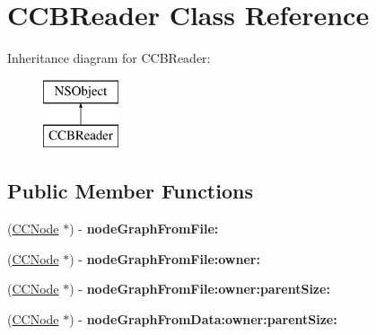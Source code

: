 \hypertarget{interface_c_c_b_reader}{\section{C\-C\-B\-Reader Class Reference}
\label{interface_c_c_b_reader}
}
Inheritance diagram for C\-C\-B\-Reader\-:\begin{figure}[H]
\begin{center}
\leavevmode
\includegraphics[height=2.000000cm]{interface_c_c_b_reader}
\end{center}
\end{figure}
\subsection*{Public Member Functions}
\begin{DoxyCompactItemize}
\item 
\hypertarget{interface_c_c_b_reader_a21a9fe5c290e7bf42a1271ffa086e96e}{(\hyperlink{class_c_c_node}{C\-C\-Node} $\ast$) -\/ {\bfseries node\-Graph\-From\-File\-:}}\label{interface_c_c_b_reader_a21a9fe5c290e7bf42a1271ffa086e96e}

\item 
\hypertarget{interface_c_c_b_reader_a1c30b37eb372c34d73dffa145f46c572}{(\hyperlink{class_c_c_node}{C\-C\-Node} $\ast$) -\/ {\bfseries node\-Graph\-From\-File\-:owner\-:}}\label{interface_c_c_b_reader_a1c30b37eb372c34d73dffa145f46c572}

\item 
\hypertarget{interface_c_c_b_reader_a81743976fb69a6f6366852ddc520f1da}{(\hyperlink{class_c_c_node}{C\-C\-Node} $\ast$) -\/ {\bfseries node\-Graph\-From\-File\-:owner\-:parent\-Size\-:}}\label{interface_c_c_b_reader_a81743976fb69a6f6366852ddc520f1da}

\item 
\hypertarget{interface_c_c_b_reader_a0f2f63cdc3fd0d84620efc113c603e30}{(\hyperlink{class_c_c_node}{C\-C\-Node} $\ast$) -\/ {\bfseries node\-Graph\-From\-Data\-:owner\-:parent\-Size\-:}}\label{interface_c_c_b_reader_a0f2f63cdc3fd0d84620efc113c603e30}

\end{DoxyCompactItemize}
